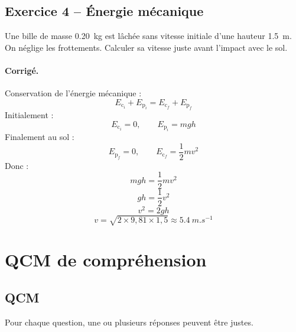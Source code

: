 \documentclass[11pt,a4paper]{article}
\newcommand{\Ec}{E_\mathrm{c}}
\newcommand{\Ep}{E_\mathrm{p}}
\begin{document}
\subsection*{Exercice 4 -- Énergie mécanique}

Une bille de masse \SI{0,20}{kg} est lâchée sans vitesse initiale d'une hauteur \SI{1,5}{m}.  
On néglige les frottements.  
Calculer sa vitesse juste avant l'impact avec le sol.

\paragraph{Corrigé.}
Conservation de l'énergie mécanique :
\[
\Ec_i+\Ep_i=\Ec_f+\Ep_f
\]
Initialement :
\[
\Ec_i=0,\qquad \Ep_i=mgh
\]
Finalement au sol :
\[
\Ep_f=0,\qquad \Ec_f=\frac12 mv^2
\]
Donc :
\[
mgh=\frac12 mv^2
\]
\[
gh=\frac12 v^2
\]
\[
v^2=2gh
\]
\[
v=\sqrt{2\times 9,81\times 1,5}
\approx \SI{5,4}{m.s^{-1}}
\]

\section{QCM de compréhension}

\subsection*{QCM}

Pour chaque question, une ou plusieurs réponses peuvent être justes.
\end{document}

